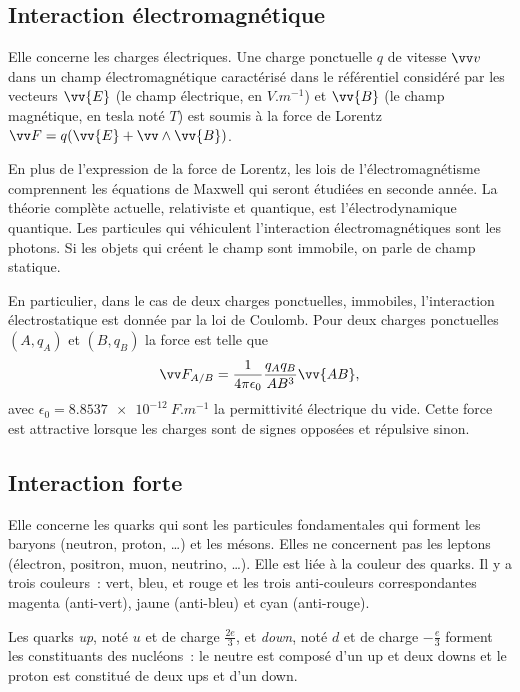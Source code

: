 \subsection{Interaction électromagnétique}%
\label{chap2-subsec:interactionelectromagnetique}%

Elle concerne les charges électriques. Une charge ponctuelle \(q\) de vitesse
\(\vvv\) dans un champ électromagnétique caractérisé dans le référentiel
considéré par les vecteurs \(\vv{E}\) (le champ électrique, en 
\(\si{V.m^{-1}}\))
et \(\vv{B}\) (le champ magnétique, en tesla noté \(\si{T}\)) est soumis à la
force de Lorentz \(\vF = q(\vv{E}+\vv \wedge \vv{B})\).

En plus de l'expression de la force de Lorentz, les lois de
l'électromagnétisme comprennent les équations de Maxwell qui seront étudiées
en seconde année. La théorie complète actuelle, relativiste et quantique, est
l'électrodynamique quantique. Les particules qui véhiculent l'interaction
électromagnétiques sont les photons. Si les objets qui créent le champ sont
immobile, on parle de champ statique.

En particulier, dans le cas de deux charges ponctuelles, immobiles,
l'interaction électrostatique est donnée par la loi de Coulomb. Pour deux
charges ponctuelles \((A, q_A)\) et \((B, q_B)\) la force est telle que
\begin{equation} \vF_{A/B} = \frac{1}{4\pi \epsilon_0} \frac{q_A q_B}{AB^3}%
\vv{AB}, \end{equation} avec \(\epsilon_0 = \SI{8,8537e-12}{F.m^{-1}}\) la%
permittivité électrique du vide. Cette force est attractive lorsque les
charges sont de signes opposées et répulsive sinon.

\subsection{Interaction forte}%
\label{chap2-subsec:interactionforte}%

Elle concerne les quarks qui sont les particules fondamentales qui forment
les baryons (neutron, proton, \ldots) et les mésons. Elles ne concernent pas
les leptons (électron, positron, muon, neutrino, \ldots). Elle est liée à la
couleur des quarks. Il y a trois couleurs~: vert, bleu, et rouge et les trois
anti-couleurs correspondantes magenta (anti-vert), jaune (anti-bleu) et cyan
(anti-rouge).

Les quarks \emph{up}, noté \(u\) et de charge \(\frac{2e}{3}\), et \emph{down},
noté \(d\) et de charge \(-\frac{e}{3}\) forment les constituants des 
nucléons~:
le neutre est composé d'un up et deux downs et le proton est constitué de
deux ups et d'un down.

